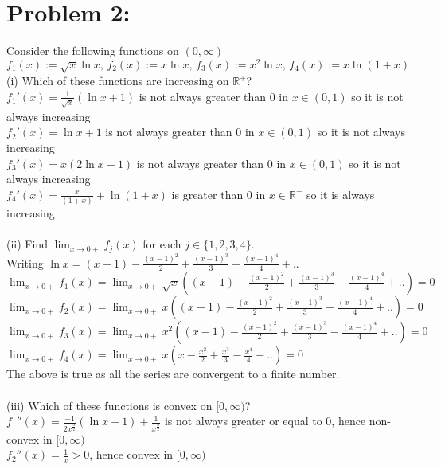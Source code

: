 \documentclass[12pt]{report}
\begin{document}
\section*{Problem 2:}
Consider the following functions on $(0, \infty)$
$$f_1 (x) := \sqrt{x} \ln x, \, f_2 (x) := x \ln x, \, f_3 (x) := x^2 \ln x,
\, f_4 (x) := x \ln (1 + x)$$
(i) Which of these functions are increasing on $\mathbb{R}^+$?\\
$ f_1'(x) = \frac{1}{\sqrt{x}} (\ln x+1) $ is not always greater than 0 in $x\in (0,1)$ so it
is not always increasing\\
$ f_2'(x) = \ln x+1 $ is not always greater than 0 in $x\in (0,1)$ so it is not always
increasing\\
$ f_3'(x) = x(2\ln x + 1)$ is not always greater than 0 in $x\in (0,1)$ so it is not always
increasing\\
$ f_4'(x) = \frac{x}{(1 + x)} + \ln(1 + x) $ is greater than 0 in $x\in \mathbb{R}^+$ so it is
always increasing\\
\\
(ii) Find $\lim_{x\rightarrow 0+} f_j (x)$ for each $j \in \{1, 2, 3, 4\}$.\\
Writing $\ln x = (x-1) - \frac{(x-1)^2}{2} + \frac{(x-1)^3}{3} - \frac{(x-1)^4}{4} + .. $\\
$\lim_{x\rightarrow 0+} f_1 (x) = \lim_{x\rightarrow 0+} \sqrt{x} \left(
(x-1) - \frac{(x-1)^2}{2} + \frac{(x-1)^3}{3} - \frac{(x-1)^4}{4} + ..\right) = 0 $\\
$\lim_{x\rightarrow 0+} f_2 (x) = \lim_{x\rightarrow 0+} x \left(
(x-1) - \frac{(x-1)^2}{2} + \frac{(x-1)^3}{3} - \frac{(x-1)^4}{4} + ..\right) = 0 $\\
$\lim_{x\rightarrow 0+} f_3 (x) = \lim_{x\rightarrow 0+} x^2 \left(
(x-1) - \frac{(x-1)^2}{2} + \frac{(x-1)^3}{3} - \frac{(x-1)^4}{4} + ..\right) = 0 $\\
$\lim_{x\rightarrow 0+} f_4 (x) = \lim_{x\rightarrow 0+} x \left(
x - \frac{x^2}{2} + \frac{x^3}{3} - \frac{x^4}{4} + ..\right) = 0 $\\
The above is true as all the series are convergent to a finite number.\\
\\
(iii) Which of these functions is convex on $[0, \infty)$?\\
$ f_1''(x) = \frac{-1}{2x^{\frac{3}{2}}} (\ln x+1) + \frac{1}{x^{\frac{3}{2}}} $ is not always
greater or equal to 0, hence non-convex in $[0, \infty)$\\
$ f_2''(x) = \frac{1}{x}>0$, hence convex in $[0, \infty)$\\
\end{document}
